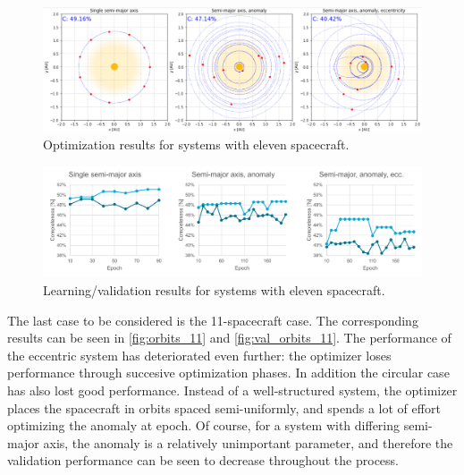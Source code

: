 \begin{figure}[htbp]
 \centering
 \includegraphics[width=1.0\textwidth]{img/orbits_11.png}
 \caption{Optimization results for systems with eleven spacecraft.}
 \label{fig:orbits_11}
\end{figure}
\begin{figure}[htbp]
 \centering
 \includegraphics[width=1.0\textwidth]{img/val_orbits_11.pdf}
 \caption{Learning/validation results for systems with eleven spacecraft.}
 \label{fig:val_orbits_11}
\end{figure}

The last case to be considered is the 11-spacecraft case. The corresponding results can be seen in \autoref{fig:orbits_11} and \autoref{fig:val_orbits_11}. The performance of the eccentric system has deteriorated even further: the optimizer loses performance through succesive optimization phases. In addition the circular case has also lost good performance. Instead of a well-structured system, the optimizer places the spacecraft in orbits spaced semi-uniformly, and spends a lot of effort optimizing the anomaly at epoch. Of course, for a system with differing semi-major axis, the anomaly is a relatively unimportant parameter, and therefore the validation performance can be seen to decrease throughout the process.\\


